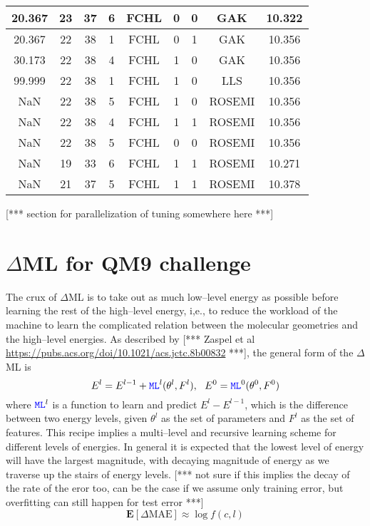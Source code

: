 \documentclass[12pt]{article}
\def\att{                    %
        \marginpar[ \hspace*{\fill} \raisebox{-0.2em}{\rule{2mm}{1.2em}} ]
        {\raisebox{-0.2em}{\rule{2mm}{1.2em}} }
        }
\def\at#1{[*** \att #1 ***]}  %
\begin{document}
\begin{table}[H]
\begin{tabular}{|c|c|c|c|c|c|c|c|c|}
		20.367	& 23	& 37	& 6	& FCHL	& 0	& 0	& GAK	& 10.322	\\ \hline
		20.367	& 22	& 38	& 1	& FCHL	& 0	& 1	& GAK	& 10.356	\\ \hline
		30.173	& 22	& 38	& 4	& FCHL	& 1	& 0	& GAK	& 10.356	\\ \hline
		99.999	& 22	& 38	& 1	& FCHL	& 1	& 0	& LLS	& 10.356	\\ \hline
		NaN	& 22	& 38	& 5	& FCHL	& 1	& 0	& ROSEMI	& 10.356	\\ \hline
		NaN	& 22	& 38	& 4	& FCHL	& 1	& 1	& ROSEMI	& 10.356	\\ \hline
		NaN	& 22	& 38	& 5	& FCHL	& 0	& 0	& ROSEMI	& 10.356	\\ \hline
		NaN	& 19	& 33	& 6	& FCHL	& 1	& 1	& ROSEMI	& 10.271	\\ \hline
		NaN	& 21	& 37	& 5	& FCHL	& 1	& 1	& ROSEMI	& 10.378	\\ \hline
	\end{tabular}
	\label{tb:hyperopt_spec_res}
\end{table}

\at{section for parallelization of tuning somewhere here}

\section{$\Delta$ML for QM9 challenge}
The crux of $\Delta$ML is to take out as much low--level energy as possible before learning the rest of the high--level energy, i,e., to reduce the workload of the machine to learn the complicated relation between the molecular geometries and the high--level energies. As described by \at{ Zaspel et al \url{https://pubs.acs.org/doi/10.1021/acs.jctc.8b00832}}, the general form of the $\Delta$ML is
\begin{equation}
    E^l = E^{l-1} + \codeword{ML}^l(\theta^l, F^l), ~~ E^0 = \codeword{ML}^0(\theta^0, F^0)
    \label{eq:deltaML}
\end{equation}
where $\codeword{ML}^l$ is a function to learn and predict $E^l - E^{l-1}$, which is the difference between two energy levels, given $\theta^l$ as the set of parameters and $F^l$ as the set of features. This recipe implies a multi--level and recursive learning scheme for different levels of energies. In general it is expected that the lowest level of energy will have the largest magnitude, with decaying magnitude of energy as we traverse up the stairs of energy levels. \at{not sure if this implies the decay of the rate of the eror too, can be the case if we assume only training error, but overfitting can still happen for test error}
\begin{equation*}
    \mathbf{E}[\Delta \text{MAE}] \approx \log f(c,l) 
\end{equation*}
\end{document}
